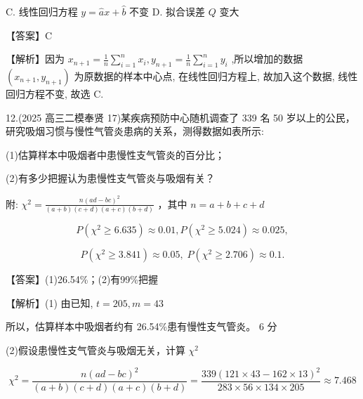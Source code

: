 \documentclass[10pt]{article}
\begin{document}
C. 线性回归方程 \(y = \widehat{a}x + \widehat{b}\) 不变 D. 拟合误差 \(Q\) 变大

【答案】C

【解析】因为 \({x}_{n + 1} = \frac{1}{n}\mathop{\sum }\limits_{{i = 1}}^{n}{x}_{i},{y}_{n + 1} = \frac{1}{n}\mathop{\sum }\limits_{{i = 1}}^{n}{y}_{i}\) ,所以增加的数据 \(\left( {{x}_{n + 1},{y}_{n + 1}}\right)\) 为原数据的样本中心点, 在线性回归方程上, 故加入这个数据, 线性回归方程不变, 故选 C.

12.(2025 高三二模奉贤 17)某疾病预防中心随机调查了 339 名 50 岁以上的公民，研究吸烟习惯与慢性气管炎患病的关系，测得数据如表所示:

\begin{center}
\end{center}

(1)估算样本中吸烟者中患慢性支气管炎的百分比；

(2)有多少把握认为患慢性支气管炎与吸烟有关？

附: \({\chi }^{2} = \frac{n{\left( ad - bc\right) }^{2}}{\left( {a + b}\right) \left( {c + d}\right) \left( {a + c}\right) \left( {b + d}\right) }\) ，其中 \(n = a + b + c + d\)

\[
P\left( {{\chi }^{2} \geq  {6.635}}\right)  \approx  {0.01},P\left( {{\chi }^{2} \geq  {5.024}}\right)  \approx  {0.025},
\]

\[
P\left( {{\chi }^{2} \geq  {3.841}}\right)  \approx  {0.05},\;P\left( {{\chi }^{2} \geq  {2.706}}\right)  \approx  {0.1}.
\]

【答案】(1)26.54\%；(2)有99\%把握

【解析】(1) 由已知, \(t = {205},m = {43}\)

所以，估算样本中吸烟者约有 26.54\%患有慢性支气管炎。 6 分

(2)假设患慢性支气管炎与吸烟无关，计算 \({\chi }^{2}\)

\[
{\chi }^{2} = \frac{n{\left( ad - bc\right) }^{2}}{\left( {a + b}\right) \left( {c + d}\right) \left( {a + c}\right) \left( {b + d}\right) } = \frac{{339}{\left( {121} \times  {43} - {162} \times  {13}\right) }^{2}}{{283} \times  {56} \times  {134} \times  {205}} \approx  {7.468}
\]
\end{document}
